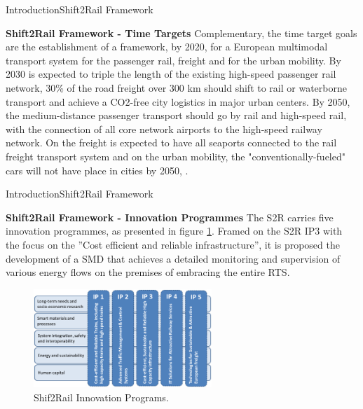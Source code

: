 \begin{frame}{Introduction}{Shift2Rail Framework}
\begin{block}{\textbf{Shift2Rail Framework - Time Targets}}
	Complementary, the time target goals are the establishment of a framework, by 2020, for a European multimodal transport system for the passenger rail, freight and for the urban mobility. By 2030 is expected to triple the length of the existing high-speed passenger rail network, 30\% of the road freight over 300 km should shift to rail or waterborne transport and achieve a CO2-free city logistics in major urban centers. By 2050, the medium-distance passenger transport should go by rail and high-speed rail, with the connection of all core network airports to the high-speed railway network. On the freight is expected to have all seaports connected to the rail freight transport system and on the urban mobility, the "conventionally-fueled" cars will not have place in cities by 2050, \cite{shift2rail2015}.
	
\end{block}
\end{frame}

\begin{frame}{Introduction}{Shift2Rail Framework}
\begin{block}{\textbf{Shift2Rail Framework - Innovation Programmes}}
The \ac{S2R} carries five innovation programmes, as presented in figure \ref{fig:ips}. Framed on the S2R \ac{IP3} with the focus on the ”Cost efficient and reliable infrastructure”, it is proposed the development of a \ac{SMD} that achieves a detailed monitoring and supervision of various energy flows on the premises of embracing the entire \ac{RTS}.
\end{block}


\begin{figure}[h!]
	\centering
	\includegraphics[width=0.60\textwidth,keepaspectratio]{figures/1.Intro/IPs}
	\caption{Shif2Rail Innovation Programs. }
	\label{fig:ips}
\end{figure}


\end{frame}

